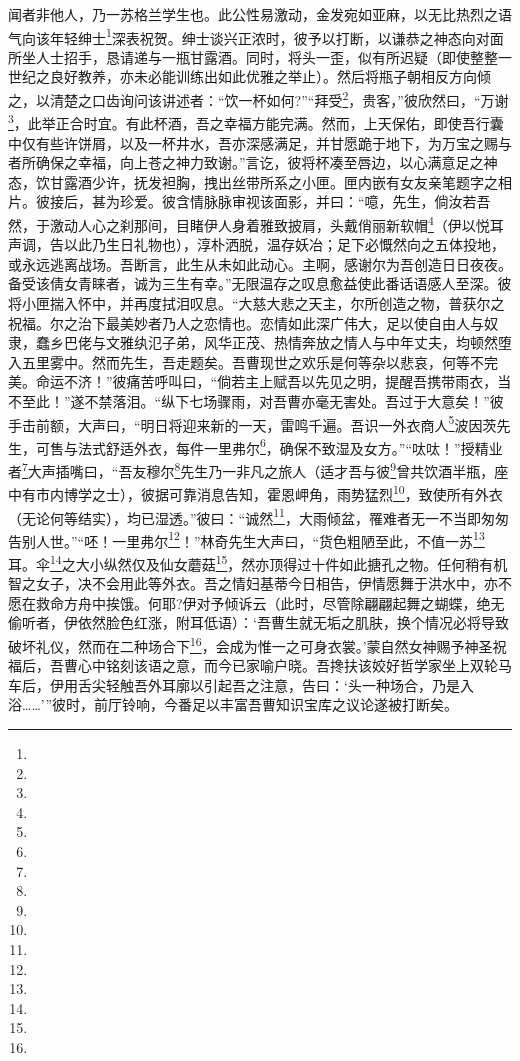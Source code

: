 \par 闻者非他人，乃一苏格兰学生也。此公性易激动，金发宛如亚麻，以无比热烈之语气向该年轻绅士\footnote{}深表祝贺。绅士谈兴正浓时，彼予以打断，以谦恭之神态向对面所坐人士招手，恳请递与一瓶甘露酒。同时，将头一歪，似有所迟疑（即使整整一世纪之良好教养，亦未必能训练出如此优雅之举止）。然后将瓶子朝相反方向倾之，以清楚之口齿询问该讲述者：“饮一杯如何?”“拜受\footnote{}，贵客，”彼欣然曰，“万谢\footnote{}，此举正合时宜。有此杯酒，吾之幸福方能完满。然而，上天保佑，即使吾行囊中仅有些许饼屑，以及一杯井水，吾亦深感满足，并甘愿跪于地下，为万宝之赐与者所确保之幸福，向上苍之神力致谢。”言讫，彼将杯凑至唇边，以心满意足之神态，饮甘露酒少许，抚发袒胸，拽出丝带所系之小匣。匣内嵌有女友亲笔题字之相片。彼接后，甚为珍爱。彼含情脉脉审视该面影，并曰：“噫，先生，倘汝若吾然，于激动人心之刹那间，目睹伊人身着雅致披肩，头戴俏丽新软帽\footnote{}（伊以悦耳声调，告以此乃生日礼物也），淳朴洒脱，温存妖冶；足下必慨然向之五体投地，或永远逃离战场。吾断言，此生从未如此动心。主啊，感谢尔为吾创造日日夜夜。备受该倩女青睐者，诚为三生有幸。”无限温存之叹息愈益使此番话语感人至深。彼将小匣揣入怀中，并再度拭泪叹息。“大慈大悲之天主，尔所创造之物，普获尔之祝福。尔之治下最美妙者乃人之恋情也。恋情如此深广伟大，足以使自由人与奴隶，蠢乡巴佬与文雅纨氾子弟，风华正茂、热情奔放之情人与中年丈夫，均顿然堕入五里雾中。然而先生，吾走题矣。吾曹现世之欢乐是何等杂以悲哀，何等不完美。命运不济！”彼痛苦呼叫曰，“倘若主上赋吾以先见之明，提醒吾携带雨衣，当不至此！”遂不禁落泪。“纵下七场骤雨，对吾曹亦毫无害处。吾过于大意矣！”彼手击前额，大声曰，“明日将迎来新的一天，雷鸣千遍。吾识一外衣商人\footnote{}波因茨先生，可售与法式舒适外衣，每件一里弗尔\footnote{}，确保不致湿及女方。”“呔呔！”授精业者\footnote{}大声插嘴曰，“吾友穆尔\footnote{}先生乃一非凡之旅人（适才吾与彼\footnote{}曾共饮酒半瓶，座中有市内博学之士），彼据可靠消息告知，霍恩岬角，雨势猛烈\footnote{}，致使所有外衣（无论何等结实），均已湿透。”彼曰：“诚然\footnote{}，大雨倾盆，罹难者无一不当即匆匆告别人世。”“呸！一里弗尔\footnote{}！”林奇先生大声曰，“货色粗陋至此，不值一苏\footnote{}耳。伞\footnote{}之大小纵然仅及仙女蘑菇\footnote{}，然亦顶得过十件如此搪孔之物。任何稍有机智之女子，决不会用此等外衣。吾之情妇基蒂今日相告，伊情愿舞于洪水中，亦不愿在救命方舟中挨饿。何耶?伊对予倾诉云（此时，尽管除翩翩起舞之蝴蝶，绝无偷听者，伊依然脸色红涨，附耳低语）：‘吾曹生就无垢之肌肤，换个情况必将导致破坏礼仪，然而在二种场合下\footnote{}，会成为惟一之可身衣裳。’蒙自然女神赐予神圣祝福后，吾曹心中铭刻该语之意，而今已家喻户晓。吾搀扶该姣好哲学家坐上双轮马车后，伊用舌尖轻触吾外耳廓以引起吾之注意，告曰：‘头一种场合，乃是入浴……’”彼时，前厅铃响，今番足以丰富吾曹知识宝库之议论遂被打断矣。
